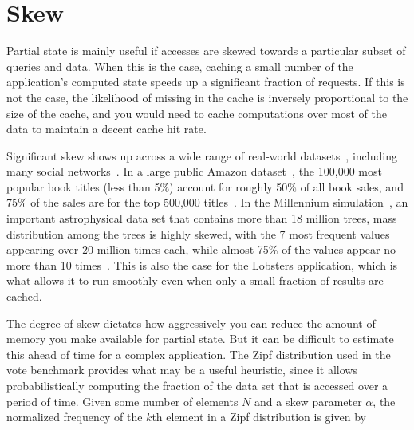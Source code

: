 % 

\section{Skew}
\label{s:eval:patterns}

Partial state is mainly useful if accesses are skewed towards a particular
subset of queries and data. When this is the case, caching a small number of the
application's computed state speeds up a significant fraction of requests. If
this is not the case, the likelihood of missing in the cache is inversely
proportional to the size of the cache, and you would need to cache computations
over most of the data to maintain a decent cache hit rate.

Significant skew shows up across a wide range of real-world
datasets~\cite{power1,power2,network-skew}, including many social
networks~\cite{network-skew2, community-skew}. In a large public Amazon
dataset~\cite{amazon-skew}, the 100,000 most popular book titles (less than 5\%)
account for roughly 50\% of all book sales, and 75\% of the sales are for the
top 500,000 titles~\cite{zhang2020permutation}. In the Millennium
simulation~\cite{large-skew}, an important astrophysical data set that contains
more than 18 million trees, mass distribution among the trees is highly skewed,
with the 7 most frequent values appearing over 20 million times each, while
almost 75\% of the values appear no more than 10
times~\cite{large-skew-analysis}. This is also the case for the Lobsters
application, which is what allows it to run smoothly even when only a small
fraction of results are cached.

The degree of skew dictates how aggressively you can reduce the amount of memory
you make available for partial state. But it can be difficult to estimate this
ahead of time for a complex application. The Zipf distribution used in the vote
benchmark provides what may be a useful heuristic, since it allows
probabilistically computing the fraction of the data set that is accessed over a
period of time. Given some number of elements $N$ and a skew parameter $\alpha$,
the normalized frequency of the $k$th element in a Zipf distribution is given by

